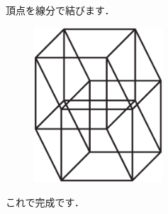 \documentclass[./main]{subfiles} %
\begin{document}

頂点を線分で結びます．

\begin{figure}[h]
\begin{center}
\includegraphics[width=48mm]{mask_rittai3.eps}
\end{center}
\end{figure}

これで完成です．

\end{document}
